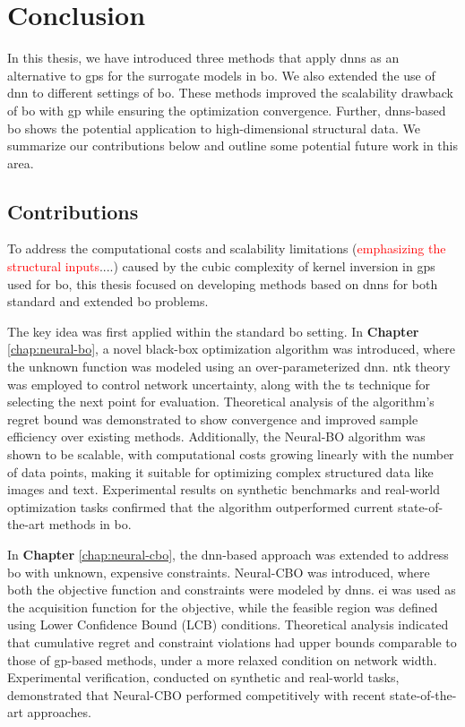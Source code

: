 \chapter{Conclusion} %

\label{chap:conclusion} %

In this thesis, we have introduced three methods that apply \acp{dnn} as an alternative to \acp{gp} for the surrogate models in \ac{bo}. We also extended the use of \ac{dnn} to different settings of \ac{bo}. These methods improved the scalability drawback of \ac{bo} with \ac{gp} while ensuring the optimization convergence. Further, \acp{dnn}-based \acl{bo} shows the potential application to high-dimensional structural data. We summarize our
contributions below and outline some potential future work in this area. 

\section{Contributions}
To address the computational costs and scalability limitations (\textcolor{red}{emphasizing the structural inputs}....)  caused by the cubic complexity of kernel inversion in \acp{gp} used for \ac{bo}, this thesis focused on developing methods based on \acp{dnn} for both standard and extended \ac{bo} problems.

The key idea was first applied within the standard \ac{bo} setting. In \textbf{Chapter} \ref{chap:neural-bo}, a novel black-box optimization algorithm was introduced, where the unknown function was modeled using an over-parameterized \ac{dnn}. \ac{ntk} theory was employed to control network uncertainty, along with the \ac{ts} technique for selecting the next point for evaluation. Theoretical analysis of the algorithm's regret bound was demonstrated to show convergence and improved sample efficiency over existing methods. Additionally, the Neural-BO algorithm was shown to be scalable, with computational costs growing linearly with the number of data points, making it suitable for optimizing complex structured data like images and text. Experimental results on synthetic benchmarks and real-world optimization tasks confirmed that the algorithm outperformed current state-of-the-art methods in \ac{bo}. 

In \textbf{Chapter} \ref{chap:neural-cbo}, the \ac{dnn}-based approach was extended to address \ac{bo} with unknown, expensive constraints. Neural-CBO was introduced, where both the objective function and constraints were modeled by \acp{dnn}. \ac{ei} was used as the acquisition function for the objective, while the feasible region was defined using Lower Confidence Bound (LCB) conditions. Theoretical analysis indicated that cumulative regret and constraint violations had upper bounds comparable to those of \ac{gp}-based methods, under a more relaxed condition on network width. Experimental verification, conducted on synthetic and real-world tasks, demonstrated that Neural-CBO performed competitively with recent state-of-the-art approaches. 

